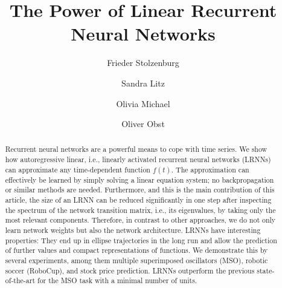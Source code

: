 \documentclass[preprint,12pt,times,authoryear]{elsarticle}%
\theoremstyle{definition}
\begin{document}
\begin{frontmatter}
\title{The Power of Linear Recurrent Neural Networks}

\author[1]{Frieder Stolzenburg}  %
\author[1]{Sandra Litz} %
\author[2]{Olivia Michael} %
\author[2]{Oliver Obst}  %


\begin{abstract}
Recurrent neural networks are a powerful means to cope with time series. We show
how autoregressive linear, i.e., linearly activated recurrent neural networks
(LRNNs) can approximate any time-dependent function $f(t)$. The approximation
can effectively be learned by simply solving a linear
equation system; no backpropagation or similar methods are needed. Furthermore,
and this is the main contribution of this article, the size of an
LRNN can be reduced significantly in one step after inspecting the spectrum
of the network transition matrix, i.e., its eigenvalues, by taking only the most
relevant components. Therefore, in contrast to other approaches, we do not only
learn network weights but also the network architecture. LRNNs have interesting
properties: They end up in ellipse trajectories in the long run and allow the
prediction of further values and compact representations of functions. We
demonstrate this by several experiments, among them multiple superimposed
oscillators (MSO), robotic soccer (RoboCup), and stock price prediction. LRNNs outperform
the previous state-of-the-art for the MSO task with a minimal number of units.
\end{abstract}



\end{frontmatter}
\end{document}
